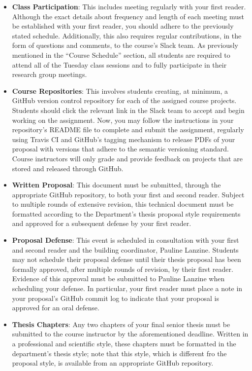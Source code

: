 \documentclass[11pt]{article}
\begin{document}
\begin{itemize}

  \item {\bf Class Participation}: This includes meeting regularly with your
    first reader. Although the exact details about frequency and length of each
    meeting must be established with your first reader, you should adhere to the
    previously stated schedule. Additionally, this also requires regular
    contributions, in the form of questions and comments, to the course's Slack
    team. As previously mentioned in the ``Course Schedule'' section, all
    students are required to attend all of the Tuesday class sessions and to
    fully participate in their research group meetings.

  \item {\bf Course Repositories}: This involves students creating, at minimum,
    a GitHub version control repository for each of the assigned course
    projects. Students should click the relevant link in the Slack team to
    accept and begin working on the assignment. Now, you may follow the
    instructions in your repository's README file to complete and submit the
    assignment, regularly using Travis CI and GitHub's tagging mechanism to
    release PDFs of your proposal with versions that adhere to the semantic
    versioning standard. Course instructors will only grade and provide feedback
    on projects that are stored and released through GitHub.

  \item {\bf Written Proposal}: This document must be submitted, through the
    appropriate GitHub repository, to both your first and second reader. Subject
    to multiple rounds of extensive revision, this technical document must be
    formatted according to the Department's thesis proposal style requirements
    and approved for a subsequent defense by your first reader.

  \item {\bf Proposal Defense}: This event is scheduled in consultation with
    your first and second reader and the building coordinator, Pauline Lanzine.
    Students may not schedule their proposal defense until their thesis proposal
    has been formally approved, after multiple rounds of revision, by their
    first reader. Evidence of this approval must be submitted to Pauline Lanzine
    when scheduling your defense. In particular, your first reader must place a
    note in your proposal's GitHub commit log to indicate that your proposal is
    approved for an oral defense.

  \item {\bf Thesis Chapters}: Any two chapters of your final senior thesis must
    be submitted to the course instructor by the aforementioned deadline.
    Written in a professional and scientific style, these chapters must be
    formatted in the department's thesis style; note that this style, which is
    different fro the proposal style, is available from an appropriate GitHub
    repository.

\end{itemize}
\end{document}
